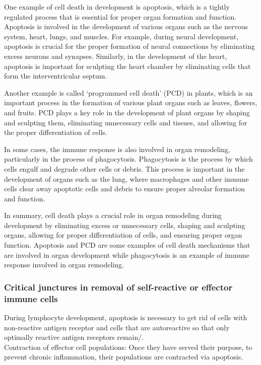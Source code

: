 \begin{itemize}
\begin{itemize}
One example of cell death in development is apoptosis, which is a tightly regulated process that is essential for proper organ formation and function. Apoptosis is involved in the development of various organs such as the nervous system, heart, lungs, and muscles. For example, during neural development, apoptosis is crucial for the proper formation of neural connections by eliminating excess neurons and synapses. Similarly, in the development of the heart, apoptosis is important for sculpting the heart chamber by eliminating cells that form the interventricular septum.

Another example is called ‘programmed cell death’ (PCD) in plants, which is an important process in the formation of various plant organs such as leaves, flowers, and fruits. PCD plays a key role in the development of plant organs by shaping and sculpting them, eliminating unnecessary cells and tissues, and allowing for the proper differentiation of cells.

In some cases, the immune response is also involved in organ remodeling, particularly in the process of phagocytosis. Phagocytosis is the process by which cells engulf and degrade other cells or debris. This process is important in the development of organs such as the lung, where macrophages and other immune cells clear away apoptotic cells and debris to ensure proper alveolar formation and function.

In summary, cell death plays a crucial role in organ remodeling during development by eliminating excess or unnecessary cells, shaping and sculpting organs, allowing for proper differentiation of cells, and ensuring proper organ function. Apoptosis and PCD are some examples of cell death mechanisms that are involved in organ development while phagocytosis is an example of immune response involved in organ remodeling.
\subsubsection{Critical junctures in removal of self-reactive or effector immune cells}
During lymphocyte development, apoptosis is necessary to get rid of cells with non-reactive antigen receptor and cells that are autoreactive so that only optimally reactive antigen receptors remain/.
\\Contraction of effector cell populations: Once they have served their purpose, to prevent chronic inflammation, their populations are contracted via apoptosis.

\end{itemize}
\end{itemize}
